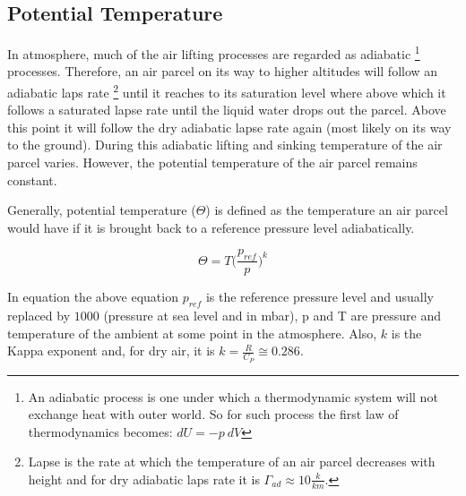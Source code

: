 \documentclass[a4paper,12pt]{article}
\numberwithin{equation}{section} %
\begin{document}
\subsection{Potential Temperature}

In atmosphere, much of the air lifting processes are regarded as adiabatic \footnote{An adiabatic process is one under which a thermodynamic system will not exchange heat with outer world. So for such process the first law of thermodynamics becomes: $dU = -p\:dV$} processes. Therefore, an air parcel on its way to higher altitudes will follow an adiabatic laps rate \footnote{Lapse is the rate at which the temperature of an air parcel decreases with height and for dry adiabatic laps rate it is $\Gamma_{ad} \approx 10 \frac{k}{km}$.} until it reaches to its saturation level where above which it follows a saturated lapse rate until the liquid water drops out the parcel. Above this point it will follow the dry adiabatic lapse rate again (most likely on its way to the ground). During this adiabatic lifting and sinking temperature of the air parcel varies. However, the potential temperature of the air parcel remains constant.

Generally, potential temperature ($\Theta$) is defined as the temperature an air parcel would have if it is brought back to a reference pressure level adiabatically. 

\vspace{0.5cm}

\begin{equation}\label{eq:7}
\Theta = T\Big(\frac{p_{ref}}{p}\Big)^k
\end{equation}

\vspace{0.5cm}


In equation the above equation $p_{ref}$ is the reference pressure level and usually replaced by $1000$ (pressure at sea level and in mbar), p and T are pressure and temperature of the ambient at some point in the atmosphere. Also, $k$ is the Kappa exponent and, for dry air, it is $k = \frac{R}{C_P}\cong 0.286$.
\end{document}

